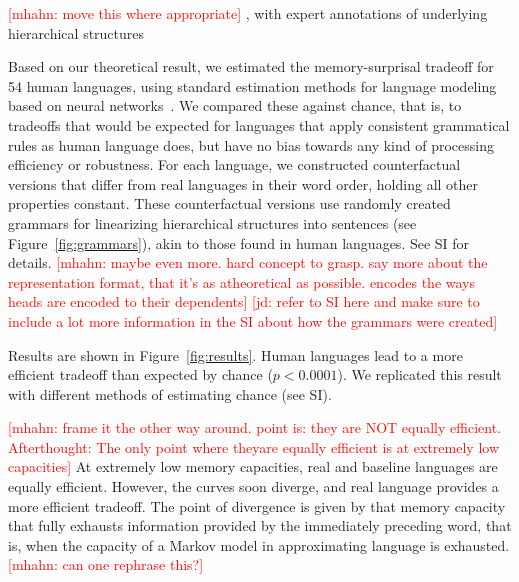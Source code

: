 \documentclass[12pt]{article}
\newcommand{\jd}[1]{\textcolor{Red}{[jd: #1]}}
\newcommand{\mhahn}[1]{\textcolor{Red}{[mhahn: #1]}}
\begin{document}
\mhahn{move this where appropriate}
, with expert annotations of underlying hierarchical structures~\cite{nivre-universal-2017}


Based on our theoretical result, we estimated the memory-surprisal tradeoff for 54 human languages, using standard estimation methods for language modeling based on neural networks~\cite{hochreiter-long-1997}.
We compared these against chance, that is, to tradeoffs that would be expected for languages that apply consistent grammatical rules as human language does, but have no bias towards any kind of processing efficiency or robustness.
For each language, we constructed counterfactual versions that differ from real languages in their word order, holding all other properties constant.
These counterfactual versions use randomly created grammars for linearizing hierarchical structures into sentences (see Figure~\ref{fig:grammars}), akin to those found in human languages.
See SI for details.
\mhahn{maybe even more. hard concept to grasp. say more about the representation format, that it's as atheoretical as possible. encodes the ways heads are encoded to their dependents}
\jd{refer to SI here and make sure to include a lot more information in the SI about how the grammars were created}


%


Results are shown in Figure~\ref{fig:results}.
Human languages lead to a more efficient tradeoff than expected by chance ($p < 0.0001$).
We replicated this result with different methods of estimating chance (see SI).

\mhahn{frame it the other way around. point is: they are NOT equally efficient. Afterthought: The only point where theyare equally efficient is at extremely low capacities}
At extremely low memory capacities, real and baseline languages are equally efficient.
However, the curves soon diverge, and real language provides a more efficient tradeoff.
The point of divergence is given by that memory capacity that fully exhausts information provided by the immediately preceding word, that is, when the capacity of a Markov model in approximating language is exhausted.
\mhahn{can one rephrase this?}
\end{document}
